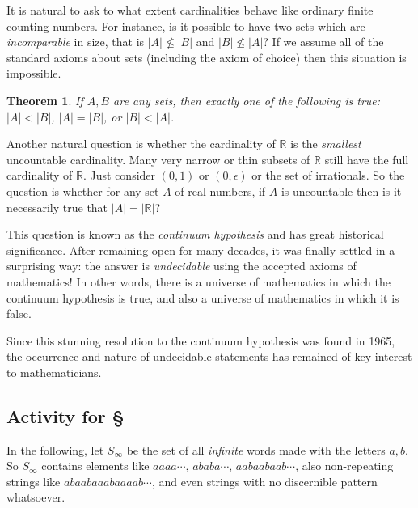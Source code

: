 \documentclass[11pt,oneside]{amsbook}
\newcommand{\R}{\mathbb R}
\theoremstyle{definition}
\theoremstyle{plain}
\newtheorem{theorem}{Theorem}[section]
\theoremstyle{definition}
\theoremstyle{remark}
\numberwithin{equation}{section}
\numberwithin{figure}{section}
\begin{document}
It is natural to ask to what extent cardinalities behave like ordinary finite counting numbers. For instance, is it possible to have two sets which are \emph{incomparable} in size, that is $|A|\not\leq|B|$ and $|B|\not\leq|A|$? If we assume all of the standard axioms about sets (including the axiom of choice) then this situation is impossible.

\begin{theorem}
  If $A,B$ are any sets, then exactly one of the following is true: $|A|<|B|$, $|A|=|B|$, or $|B|<|A|$.
\end{theorem}

Another natural question is whether the cardinality of $\R$ is the \emph{smallest} uncountable cardinality. Many very narrow or thin subsets of $\R$ still have the full cardinality of $\R$. Just consider $(0,1)$ or $(0,\epsilon)$ or the set of irrationals. So the question is whether for any set $A$ of real numbers, if $A$ is uncountable then is it necessarily true that $|A|=|\R|$?

This question is known as the \emph{continuum hypothesis} and has great historical significance. After remaining open for many decades, it was finally settled in a surprising way: the answer is \emph{undecidable} using the accepted axioms of mathematics! In other words, there is a universe of mathematics in which the continuum hypothesis is true, and also a universe of mathematics in which it is false.

Since this stunning resolution to the continuum hypothesis was found in 1965, the occurrence and nature of undecidable statements has remained of key interest to mathematicians.

\newpage
\subsection*{Activity for \S \thesection}

In the following, let $S_{\infty}$ be the set of all \emph{infinite} words made with the letters $a,b$. So $S_\infty$ contains elements like $aaaa\cdots$, $ababa\cdots$, $aabaabaab\cdots$, also non-repeating strings like $abaabaaabaaaab\cdots$, and even strings with no discernible pattern whatsoever.
\end{document}
